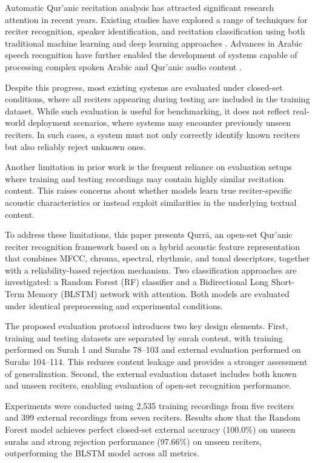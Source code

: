 \documentclass[conference]{IEEEtran}
\begin{document}
Automatic Qur'anic recitation analysis has attracted significant research attention in recent years. Existing studies have explored a range of techniques for reciter recognition, speaker identification, and recitation classification using both traditional machine learning and deep learning approaches \cite{ref1, ref3, ref4, ref5, ref6, ref7, ref11, ref12}. Advances in Arabic speech recognition have further enabled the development of systems capable of processing complex spoken Arabic and Qur'anic audio content \cite{ref8}.

Despite this progress, most existing systems are evaluated under closed-set conditions, where all reciters appearing during testing are included in the training dataset. While such evaluation is useful for benchmarking, it does not reflect real-world deployment scenarios, where systems may encounter previously unseen reciters. In such cases, a system must not only correctly identify known reciters but also reliably reject unknown ones.

Another limitation in prior work is the frequent reliance on evaluation setups where training and testing recordings may contain highly similar recitation content. This raises concerns about whether models learn true reciter-specific acoustic characteristics or instead exploit similarities in the underlying textual content.

To address these limitations, this paper presents Qurr\={a}, an open-set Qur'anic reciter recognition framework based on a hybrid acoustic feature representation that combines MFCC, chroma, spectral, rhythmic, and tonal descriptors, together with a reliability-based rejection mechanism. Two classification approaches are investigated: a Random Forest (RF) classifier and a Bidirectional Long Short-Term Memory (BLSTM) network with attention. Both models are evaluated under identical preprocessing and experimental conditions.

The proposed evaluation protocol introduces two key design elements. First, training and testing datasets are separated by surah content, with training performed on Surah 1 and Surahs 78--103 and external evaluation performed on Surahs 104--114. This reduces content leakage and provides a stronger assessment of generalization. Second, the external evaluation dataset includes both known and unseen reciters, enabling evaluation of open-set recognition performance.

Experiments were conducted using 2,535 training recordings from five reciters and 399 external recordings from seven reciters. Results show that the Random Forest model achieves perfect closed-set external accuracy (100.0\%) on unseen surahs and strong rejection performance (97.66\%) on unseen reciters, outperforming the BLSTM model across all metrics.
\end{document}
